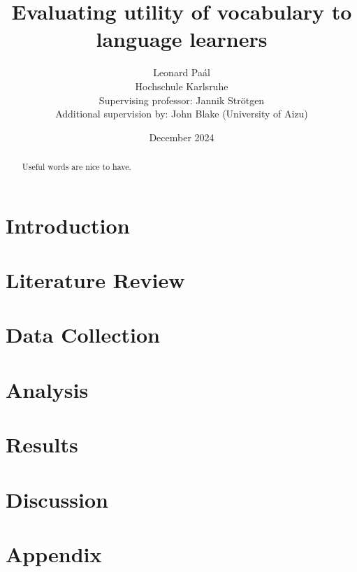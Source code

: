\documentclass[12pt]{report}
\title{Evaluating utility of vocabulary to language learners}
\author{Leonard Paál\\Hochschule Karlsruhe\\Supervising professor: Jannik Strötgen\\Additional supervision by: John Blake (University of Aizu)}
\date{December 2024}
\begin{document}
\maketitle
\begin{abstract}
	\noindent Useful words are nice to have.
\end{abstract}

\clearpage
\tableofcontents
\listoffigures
\listoftables
\clearpage

\chapter{Introduction}

\chapter{Literature Review}

\chapter{Data Collection}

\chapter{Analysis}

\chapter{Results}

\chapter{Discussion}


\chapter{Appendix}




\end{document}
